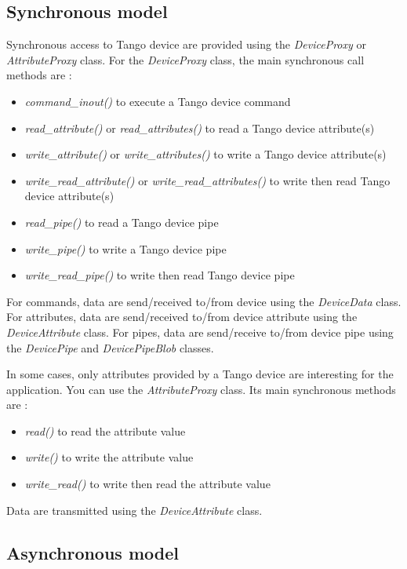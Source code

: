 \subsection{Synchronous model}

Synchronous access to Tango device are provided using the \emph{DeviceProxy}
or \emph{AttributeProxy} class. For the \emph{DeviceProxy} class,
the main synchronous call methods are :
\begin{itemize}
\item \emph{command\_inout()} to execute a Tango device command
\item \emph{read\_attribute()} or \emph{read\_attributes()} to read a Tango
device attribute(s)
\item \emph{write\_attribute()} or \emph{write\_attributes()} to write a
Tango device attribute(s)
\item \emph{write\_read\_attribute()} or \emph{write\_read\_attributes()}
to write then read Tango device attribute(s)
\item \emph{read\_pipe()} to read a Tango device pipe
\item \emph{write\_pipe()} to write a Tango device pipe
\item \emph{write\_read\_pipe()} to write then read Tango device pipe
\end{itemize}
For commands, data are send/received to/from device using the \emph{DeviceData}
class. For attributes, data are send/received to/from device attribute
using the \emph{DeviceAttribute} class. For pipes, data are send/receive
to/from device pipe using the \emph{DevicePipe}
and \emph{DevicePipeBlob} classes.

In some cases, only attributes provided by a Tango device are interesting
for the application. You can use the \emph{AttributeProxy} class.
Its main synchronous methods are :
\begin{itemize}
\item \emph{read()} to read the attribute value
\item \emph{write()} to write the attribute value
\item \emph{write\_read()} to write then read the attribute value
\end{itemize}
Data are transmitted using the \emph{DeviceAttribute} class.

\subsection{Asynchronous model}

